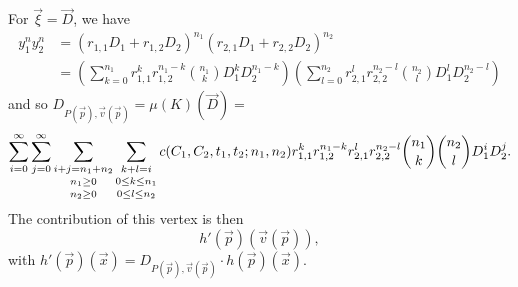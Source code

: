 For $\vec \xi = \vec D$, we have
\begin{align*}
y_1^n y_2^n
& =
\left( r_{1,1} D_1 + r_{1,2} D_2 \right)^{n_1}
\left( r_{2,1} D_1 + r_{2,2} D_2 \right)^{n_2}
\\
& =
\left(
\sum_{k=0}^{n_1} r_{1,1}^k r_{1,2}^{n_1 - k} { n_1 \choose k} D_1^k D_2^{n_1-k}
\right)
\left(
\sum_{l=0}^{n_2} r_{2,1}^l r_{2,2}^{n_2 - l} { n_2 \choose l} D_1^l D_2^{n_2-l}
\right)
\end{align*}
and so
$
D_{P(\vec p), \vec v(\vec p)} = \mu(K)(\vec D)
=
$
$$
\sum_{i=0}^\infty
\sum_{j=0}^\infty
\sum_{\shortstack{$\scriptstyle i+j = n_1+n_2$\\$\scriptstyle n_1 \ge 0$\\$\scriptstyle n_2 \ge 0$}}
\sum_{\shortstack{$\scriptstyle k+l = i$\\$\scriptstyle 0 \le k \le n_1$\\$\scriptstyle 0 \le l \le n_2$}}
c(C_1, C_2, t_1, t_2; n_1, n_2)
r_{1,1}^k r_{1,2}^{n_1 - k}
r_{2,1}^l r_{2,2}^{n_2 - l}
{ n_1 \choose k} { n_2 \choose l} D_1^i D_2^j
.
$$
The contribution of this vertex is then
$$
h'(\vec p)(\vec v(\vec p))
,
$$
with $
h'(\vec p)(\vec x) = D_{P(\vec p), \vec v(\vec p)} \cdot h(\vec p)(\vec x)
$.


